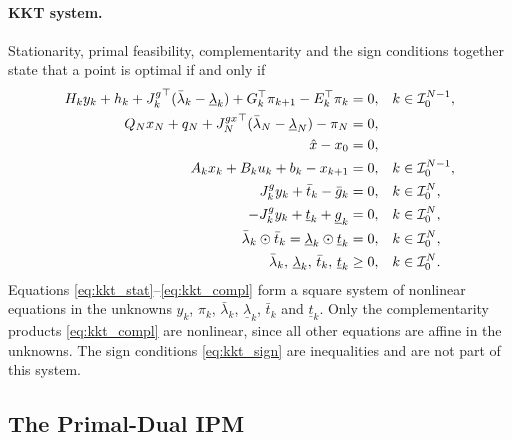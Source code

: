 \paragraph{KKT system.}
Stationarity, primal feasibility, complementarity and the sign conditions together state that a point is optimal if and only if
\begin{subequations}\label{eq:kkt}
\begin{align}
    H_k y_k + h_k + {J^{g}_{k}}^\top(\bar{\lambda}_k - \underline{\lambda}_k) + G_k^\top \pi_{k+1} - E_k^\top \pi_k &= 0, && k\in\mathcal{I}_{0}^{N-1}, \label{eq:kkt_stat}\\
    Q_N x_N + q_N + {J^{gx}_{N}}^\top(\bar{\lambda}_N - \underline{\lambda}_N) - \pi_N &= 0, && \label{eq:kkt_stat_N}\\
    \hat{x} - x_0 &= 0, && \label{eq:kkt_init}\\
    A_k x_k + B_k u_k + b_k - x_{k+1} &= 0, && k\in\mathcal{I}_{0}^{N-1}, \label{eq:kkt_dyn}\\
    {J^{g}_{k}} y_k + \bar{t}_k - \bar{g}_k &= 0, && k\in\mathcal{I}_{0}^{N}, \label{eq:kkt_slack_up}\\
    -{J^{g}_{k}} y_k + \underline{t}_k + \underline{g}_k &= 0, && k\in\mathcal{I}_{0}^{N}, \label{eq:kkt_slack_lo}\\
    \bar{\lambda}_k \odot \bar{t}_k = \underline{\lambda}_k \odot \underline{t}_k &= 0, && k\in\mathcal{I}_{0}^{N}, \label{eq:kkt_compl}\\
    \bar{\lambda}_k,\, \underline{\lambda}_k,\, \bar{t}_k,\, \underline{t}_k &\geq 0, && k\in\mathcal{I}_{0}^{N}. \label{eq:kkt_sign}
\end{align}
\end{subequations}
Equations \eqref{eq:kkt_stat}--\eqref{eq:kkt_compl} form a square system of nonlinear equations in the unknowns $y_k$, $\pi_k$, $\bar{\lambda}_k$, $\underline{\lambda}_k$, $\bar{t}_k$ and $\underline{t}_k$.
Only the complementarity products \eqref{eq:kkt_compl} are nonlinear, since all other equations are affine in the unknowns.
The sign conditions \eqref{eq:kkt_sign} are inequalities and are not part of this system.

\subsection{The Primal-Dual IPM}
\label{sec:ipm}

